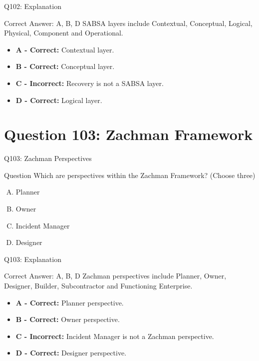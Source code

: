 \documentclass{beamer}
\begin{document}
	\begin{frame}{Q102: Explanation}
		\begin{block}{Correct Answer: A, B, D}
			SABSA layers include Contextual, Conceptual,
			Logical, Physical, Component and Operational.
		\end{block}
		
		\begin{itemize}
			\item \textbf{A - Correct:} Contextual layer.
			\item \textbf{B - Correct:} Conceptual layer.
			\item \textbf{C - Incorrect:} Recovery is not a SABSA layer.
			\item \textbf{D - Correct:} Logical layer.
		\end{itemize}
	\end{frame}
	
	\section{Question 103: Zachman Framework}
	
	\begin{frame}{Q103: Zachman Perspectives}
		\begin{block}{Question}
			Which are perspectives within the Zachman Framework?
			(Choose three)
		\end{block}
		
		\begin{enumerate}[(A)]
			\item Planner
			\item Owner
			\item Incident Manager
			\item Designer
		\end{enumerate}
	\end{frame}
	
	\begin{frame}{Q103: Explanation}
		\begin{block}{Correct Answer: A, B, D}
			Zachman perspectives include Planner, Owner,
			Designer, Builder, Subcontractor and Functioning Enterprise.
		\end{block}
		
		\begin{itemize}
			\item \textbf{A - Correct:} Planner perspective.
			\item \textbf{B - Correct:} Owner perspective.
			\item \textbf{C - Incorrect:} Incident Manager is not a Zachman perspective.
			\item \textbf{D - Correct:} Designer perspective.
		\end{itemize}
	\end{frame}
	
\end{document}
